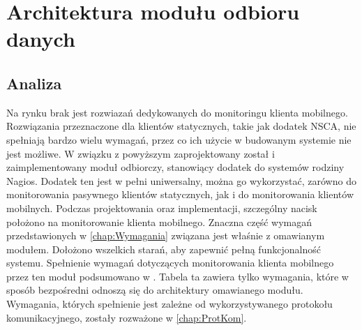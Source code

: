 \chapter{Architektura modułu odbioru danych}
\label{chap:ArchDaemona}

\section[Analiza][Analiza]{Analiza}

Na rynku brak jest rozwiazań dedykowanych do monitoringu klienta
mobilnego. Rozwiązania przeznaczone dla klientów statycznych, takie
jak dodatek NSCA, nie spełniają bardzo wielu wymagań, przez co ich
użycie w budowanym systemie nie jest możliwe. W związku z powyższym
zaprojektowany został i zaimplementowany moduł odbiorczy, stanowiący
dodatek do systemów rodziny Nagios. Dodatek ten jest w pełni
uniwersalny, można go wykorzystać, zarówno do monitorowania pasywnego
klientów statycznych, jak i do monitorowania klientów
mobilnych. Podczas projektowania oraz implementacji, szczególny nacisk
położono na monitorowanie klienta mobilnego. Znaczna część wymagań
przedstawionych w \ref{chap:Wymagania} związana jest właśnie z
omawianym modułem. Dołożono wszelkich starań, aby zapewnić pełną
funkcjonalność systemu. Spełnienie wymagań dotyczących monitorowania
klienta mobilnego przez ten moduł podsumowano w . Tabela ta zawiera
tylko wymagania, które w sposób bezpośredni odnoszą się do
architektury omawianego modułu. Wymagania, których spełnienie jest
zależne od wykorzystywanego protokołu komunikacyjnego, zostały
rozważone w \ref{chap:ProtKom}.

